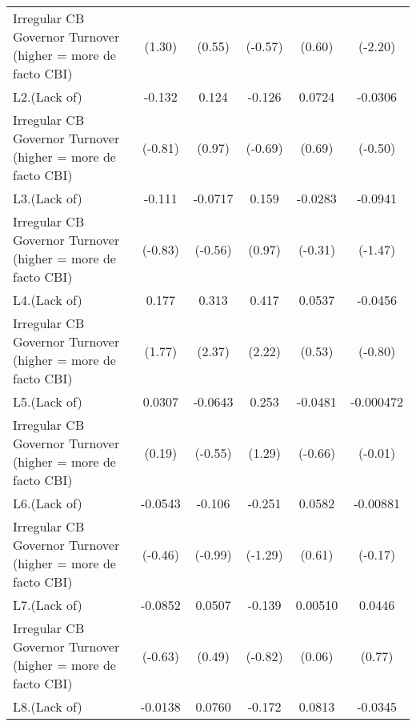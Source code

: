 {\begin{tabular}{l*{5}{c}}
Irregular CB Governor Turnover (higher = more de facto CBI)&      (1.30)         &      (0.55)         &     (-0.57)         &      (0.60)         &     (-2.20)         \\
[1em]
L2.(Lack of)        &      -0.132         &       0.124         &      -0.126         &      0.0724         &     -0.0306         \\
Irregular CB Governor Turnover (higher = more de facto CBI)&     (-0.81)         &      (0.97)         &     (-0.69)         &      (0.69)         &     (-0.50)         \\
[1em]
L3.(Lack of)        &      -0.111         &     -0.0717         &       0.159         &     -0.0283         &     -0.0941         \\
Irregular CB Governor Turnover (higher = more de facto CBI)&     (-0.83)         &     (-0.56)         &      (0.97)         &     (-0.31)         &     (-1.47)         \\
[1em]
L4.(Lack of)        &       0.177         &       0.313\sym{*}  &       0.417\sym{*}  &      0.0537         &     -0.0456         \\
Irregular CB Governor Turnover (higher = more de facto CBI)&      (1.77)         &      (2.37)         &      (2.22)         &      (0.53)         &     (-0.80)         \\
[1em]
L5.(Lack of)        &      0.0307         &     -0.0643         &       0.253         &     -0.0481         &   -0.000472         \\
Irregular CB Governor Turnover (higher = more de facto CBI)&      (0.19)         &     (-0.55)         &      (1.29)         &     (-0.66)         &     (-0.01)         \\
[1em]
L6.(Lack of)        &     -0.0543         &      -0.106         &      -0.251         &      0.0582         &    -0.00881         \\
Irregular CB Governor Turnover (higher = more de facto CBI)&     (-0.46)         &     (-0.99)         &     (-1.29)         &      (0.61)         &     (-0.17)         \\
[1em]
L7.(Lack of)        &     -0.0852         &      0.0507         &      -0.139         &     0.00510         &      0.0446         \\
Irregular CB Governor Turnover (higher = more de facto CBI)&     (-0.63)         &      (0.49)         &     (-0.82)         &      (0.06)         &      (0.77)         \\
[1em]
L8.(Lack of)        &     -0.0138         &      0.0760         &      -0.172         &      0.0813         &     -0.0345         \\

\end{tabular}}
